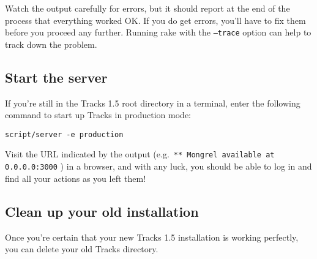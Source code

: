 \documentclass[10pt,twoside]{memoir}
\def\mybibliostyle{plain}
\def\bibliocommand{}
\begin{document}
Watch the output carefully for errors, but it should report at the end of the process that everything worked OK. If you do get errors, you'll have to fix them before you proceed any further. Running rake with the \texttt{--trace} option can help to track down the problem.


\subsection{Start the server}
\label{startserver_upgrade}

If you're still in the Tracks 1.5 root directory in a terminal, enter the following command to start up Tracks in production mode:


\texttt{script/server -e production}


Visit the URL indicated by the output (e.g.\ \texttt{** Mongrel available at 0.0.0.0:3000}
) in a browser, and with any luck, you should be able to log in and find all your actions as you left them!


\subsection{Clean up your old installation}
\label{cleanup_upgrade}

Once you're certain that your new Tracks 1.5 installation is working perfectly, you can delete your old Tracks directory.


%
%

\backmatter


\bibliocommand

\printglossary


\printindex
\end{document}
